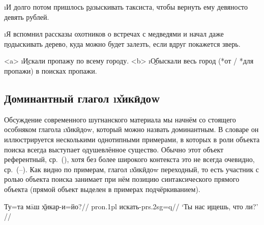 \i{И долго потом пришлось \b{разыскивать} таксиста, чтобы вернуть ему девяносто девять рублей.} 
\xe

\i{Я вспомнил рассказы охотников о встречах с медведями и начал даже \b{подыскивать} дерево, куда можно будет залезть, если вдруг покажется зверь.} 
\xe

\a<a> \i{\b{Искали} пропажу по всему городу.}
\a<b> \i{\b{Обыскали} весь город (*от / *для пропажи) в поисках пропажи.}
\xe

\subsection{Доминантный глагол \i{х̌икӣдоw}}

Обсуждение современного шугнанского материала мы начнём со стоящего особняком глагола \i{х̌икӣдоw}, который можно назвать доминантным. В словаре он иллюстрируется несколькими однотипными примерами, в которых в роли объекта поиска всегда выступает одушевлённое существо. Обычно этот объект референтный, ср.~(), хотя без более широкого контекста это не всегда очевидно, ср.~(–). Как видно по примерам, глагол \i{х̌икӣдоw} переходный, то есть участник с ролью объекта поиска занимает при нём позицию синтаксического прямого объекта (прямой объект выделен в примерах подчёркиванием).

\begingl
\gla Ту=та мāш \b{х̌икар-и}=йо?//
 {\sc pron.1pl} искать-{\sc prs.2sg=q}//
\glft ‘Ты нас \b{ищешь}, что ли?’ //
\endgl \xe

